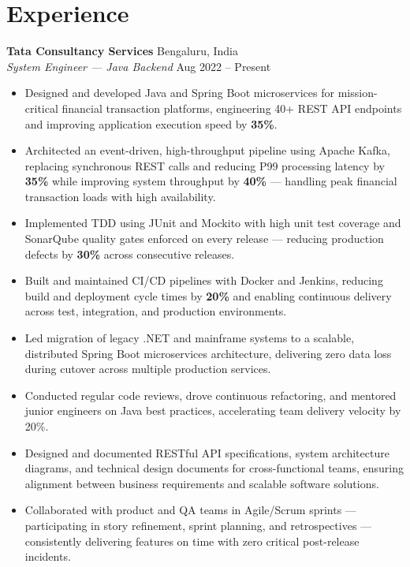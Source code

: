 \documentclass[9pt, letterpaper]{extarticle}
\newcommand{\entry}[4]{
  \textbf{#1} \hfill \textcolor{subtle}{\small #2} \\
  \textit{\small\textcolor{subtle}{#3}} \hfill \textcolor{subtle}{\small #4}
}
\begin{document}
\section{Experience}

\entry{Tata Consultancy Services}{Bengaluru, India}
      {System Engineer --- Java Backend}{Aug 2022 -- Present}
\begin{itemize}
  \item Designed and developed Java and Spring Boot microservices for mission-critical financial transaction platforms, engineering 40+ REST API endpoints and improving application execution speed by \textbf{35\%}.
  \item Architected an event-driven, high-throughput pipeline using Apache Kafka, replacing synchronous REST calls and reducing P99 processing latency by \textbf{35\%} while improving system throughput by \textbf{40\%} --- handling peak financial transaction loads with high availability.
  \item Implemented TDD using JUnit and Mockito with high unit test coverage and SonarQube quality gates enforced on every release --- reducing production defects by \textbf{30\%} across consecutive releases.
  \item Built and maintained CI/CD pipelines with Docker and Jenkins, reducing build and deployment cycle times by \textbf{20\%} and enabling continuous delivery across test, integration, and production environments.
  \item Led migration of legacy .NET and mainframe systems to a scalable, distributed Spring Boot microservices architecture, delivering zero data loss during cutover across multiple production services.
  \item Conducted regular code reviews, drove continuous refactoring, and mentored junior engineers on Java best practices, accelerating team delivery velocity by 20\%.
  \item Designed and documented RESTful API specifications, system architecture diagrams, and technical design documents for cross-functional teams, ensuring alignment between business requirements and scalable software solutions.
  \item Collaborated with product and QA teams in Agile/Scrum sprints --- participating in story refinement, sprint planning, and retrospectives --- consistently delivering features on time with zero critical post-release incidents.
\end{itemize}
\end{document}
